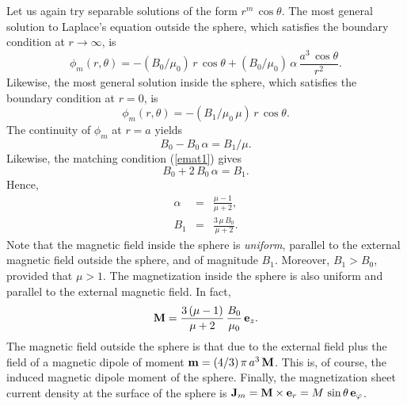 Let us again try separable solutions of the form $r^m\,\cos\theta$. The most general solution to Laplace's equation outside
the sphere, which satisfies the boundary condition at $r\rightarrow\infty$, is
\begin{equation}
\phi_m(r,\theta) = - (B_0/\mu_0)\,r\,\cos\theta + (B_0/\mu_0)\,\alpha \,\frac{a^3\,\cos\theta}{r^2}.
\end{equation}
Likewise, the most general solution inside the sphere, which satisfies
the boundary condition at $r=0$, is
\begin{equation}
\phi_m(r,\theta) = - (B_1/\mu_0\,\mu)\,r\,\cos\theta.
\end{equation}
The continuity of $\phi_m$ at $r=a$ yields
\begin{equation}
B_0 - B_0\,\alpha = B_1/\mu.
\end{equation}
Likewise, the matching condition (\ref{emat1}) gives
\begin{equation}
B_0 + 2\,B_0\,\alpha = B_1.
\end{equation}
Hence,
\begin{eqnarray}
\alpha &=& \frac{\mu-1}{\mu+2},\\[0.5ex]
B_1 &=& \frac{3\,\mu\,B_0}{\mu+2}.
\end{eqnarray}
Note that the magnetic field inside the sphere is {\em uniform}, parallel
to the external magnetic field outside the sphere, and of magnitude $B_1$. Moreover, $B_1 > B_0$,  provided that $\mu>1$. The magnetization inside
the sphere is also uniform and parallel to the external magnetic field. In fact,
\begin{equation}
{\bf M} = \frac{3\,(\mu-1)}{\mu+2}\,\frac{B_0}{\mu_0}\,{\bf e}_z.
\end{equation}
The magnetic field outside the sphere is that due to the external field plus
the field of a magnetic dipole of moment ${\bf m} = (4/3)\,\pi\,a^3\,{\bf M}$.
This is, of course, the induced magnetic dipole moment of the sphere.
Finally, the magnetization sheet current density at the surface of the
sphere is ${\bf J}_m = {\bf M}\times {\bf e}_r  = M\,\sin\theta\,{\bf e}_\varphi$.


